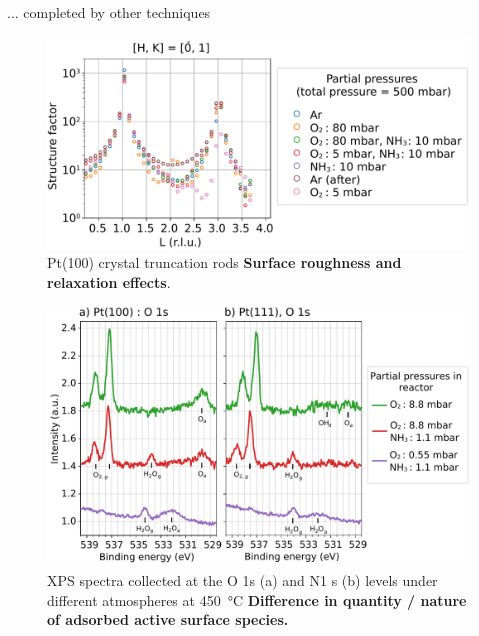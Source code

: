 \documentclass[final]{beamer}
\newlength{\colwidth}
\begin{document}
\begin{frame}[t]
\begin{columns}[t]
\begin{column}{\colwidth}
\begin{exampleblock}{... completed by other techniques}
        \begin{figure}
            \centering
            \includegraphics[width=0.95\colwidth]{Figures/CTR.pdf}
            \caption{Pt(100) crystal truncation rods \rightarrow \textbf{Surface roughness and relaxation effects}.}
        \end{figure}


        \begin{figure}
            \centering
            \includegraphics[width=0.9\colwidth]{Figures/O1sSlidesBis.pdf}
            \caption{XPS spectra collected at the O 1s (a) and N1 s (b) levels under different atmospheres at \qty{450}{\degreeCelsius} \rightarrow \textbf{Difference in quantity / nature of adsorbed active surface species.}}
            \label{fig:XPS}
        \end{figure}

    \end{exampleblock}

    \vspace{-0.5cm}


\end{column}
\end{columns}
\end{frame}
\end{document}
